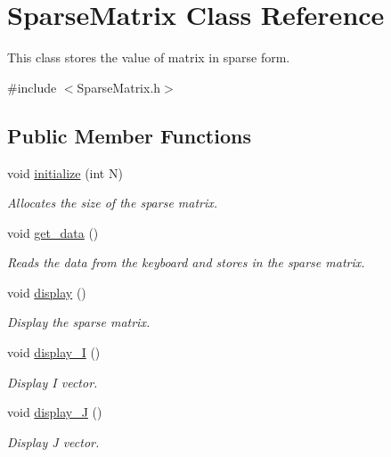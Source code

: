 \hypertarget{class_sparse_matrix}{}\section{Sparse\+Matrix Class Reference}
\label{class_sparse_matrix}


This class stores the value of matrix in sparse form.  




{\ttfamily \#include $<$Sparse\+Matrix.\+h$>$}

\subsection*{Public Member Functions}
\begin{DoxyCompactItemize}
\item 
void \hyperlink{class_sparse_matrix_a162de2c1ddf9ab27aa45f96e8a3b03ae}{initialize} (int N)
\begin{DoxyCompactList}\small\item\em Allocates the size of the sparse matrix. \end{DoxyCompactList}\item 
void \hyperlink{class_sparse_matrix_a5d4c3ed7f638b2376d12e62489823880}{get\+\_\+data} ()
\begin{DoxyCompactList}\small\item\em Reads the data from the keyboard and stores in the sparse matrix. \end{DoxyCompactList}\item 
void \hyperlink{class_sparse_matrix_a5030663c5514c3cd1fca0b52d075abe8}{display} ()
\begin{DoxyCompactList}\small\item\em Display the sparse matrix. \end{DoxyCompactList}\item 
void \hyperlink{class_sparse_matrix_a804f326a1d6acae360bb61dd65a6e1b5}{display\+\_\+\+I} ()
\begin{DoxyCompactList}\small\item\em Display I vector. \end{DoxyCompactList}\item 
void \hyperlink{class_sparse_matrix_a793b6d80478f11bd8751d4dd461a39d7}{display\+\_\+\+J} ()
\begin{DoxyCompactList}\small\item\em Display J vector. \end{DoxyCompactList}\item 

\end{DoxyCompactItemize}
